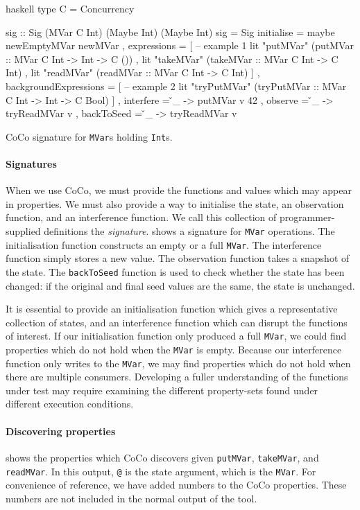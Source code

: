 \begin{listing}
\centering
\begin{cminted}{haskell}
type C = Concurrency

sig :: Sig (MVar C Int) (Maybe Int) (Maybe Int)
sig = Sig
  { initialise  = maybe newEmptyMVar newMVar
  , expressions =
    [ -- example 1
      lit "putMVar"  (putMVar  :: MVar C Int -> Int -> C ())
    , lit "takeMVar" (takeMVar :: MVar C Int -> C Int)
    , lit "readMVar" (readMVar :: MVar C Int -> C Int)
    ]
  , backgroundExpressions =
    [ -- example 2
      lit "tryPutMVar" (tryPutMVar :: MVar C Int -> Int -> C Bool)
    ]
  , interfere  = \v _ -> putMVar v 42
  , observe    = \v _ -> tryReadMVar v
  , backToSeed = \v _ -> tryReadMVar v
  }
\end{cminted}
\caption{CoCo signature for \texttt{MVar}s holding \texttt{Int}s.}\label{lst:mvar}
\end{listing}

\paragraph{Signatures}
When we use CoCo, we must provide the functions and values which may
appear in properties.  We must also provide a way to initialise the
state, an observation function, and an interference function.  We call
this collection of programmer-supplied definitions the
\emph{signature}.   shows a signature for \verb|MVar|
operations.  The initialisation function constructs an empty or a full
\verb|MVar|.  The interference function simply stores a new value.
The observation function takes a snapshot of the state.  The
\verb|backToSeed| function is used to check whether the state has been
changed: if the original and final seed values are the same, the state
is unchanged.

It is essential to provide an initialisation function which gives a
representative collection of states, and an interference function
which can disrupt the functions of interest.  If our initialisation
function only produced a full \verb|MVar|, we could find properties
which do not hold when the \verb|MVar| is empty.  Because our
interference function only writes to the \verb|MVar|, we may find
properties which do not hold when there are multiple consumers.
Developing a fuller understanding of the functions under test may
require examining the different property-sets found under different
execution conditions.

\paragraph{Discovering properties}
 shows the properties which CoCo discovers given
\verb|putMVar|, \verb|takeMVar|, and \verb|readMVar|.  In this output,
\verb|@| is the state argument, which is the \verb|MVar|.  For
convenience of reference, we have added numbers to the CoCo
properties.  These numbers are not included in the normal output of
the tool.


